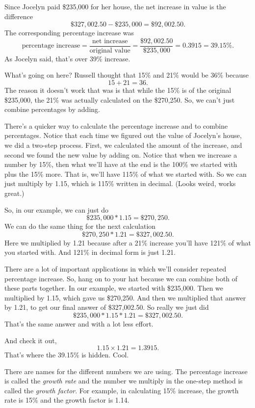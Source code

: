 Since Jocelyn paid \$235,000 for her house, the net increase in value is the difference $$\$327,002.50 - \$235,000 = \$92,002.50.$$ The corresponding percentage increase was $$\text{percentage increase} = \frac{\text{net increase}}{\text{original value}} =\frac{\$92,002.50}{\$235,000}= 0.3915 = 39.15\%.$$  As Jocelyn said, that's over 39\% increase.

What's going on here? Russell thought that 15\% and 21\% would be 36\% because $$15 + 21 = 36.$$ The reason it doesn't work that was is that while the 15\% is of the original \$235,000, the 21\% was actually calculated on the \$270,250.  So, we can't just combine percentages by adding.

There's a quicker way to calculate the percentage increase and to combine percentages.  Notice that each time we figured out the value of Jocelyn's house, we did a two-step process.  First, we calculated the amount of the increase, and second we found the new value by adding on.  Notice that when we increase a number by 15\%, then what we'll have at the end is the 100\% we started with plus the 15\% more.  That is, we'll have 115\% of what we started with.  So we can just multiply by 1.15, which is 115\% written in decimal.  (Looks weird, works great.)  

So, in our example, we can just do $$\$235,000 \ast 1.15 = \$270,250.$$  We can do the same thing for the next calculation $$\$270,250 \ast 1.21 = \$327,002.50.$$  Here we multiplied by 1.21 because after a 21\% increase you'll have 121\% of what you started with.  And 121\% in decimal form is just 1.21.

There are a lot of important applications in which we'll consider repeated percentage increase.  So, hang on to your hat because we can combine both of these parts together.  In our example, we started with \$235,000.  Then we multiplied by 1.15, which gave us \$270,250.  And then we multiplied that answer by 1.21, to get our final answer of \$327,002.50.  So really we just did $$\$235,000 \ast 1.15 \ast 1.21 = \$327,002.50.$$  That's the same answer and with a lot less effort.

And check it out, $$1.15 \times 1.21 = 1.3915.$$ That's where the 39.15\% is hidden. Cool.

There are names for the different numbers we are using.  The percentage increase is called the \emph{growth rate} and the number we multiply in the one-step method is called the \emph{growth factor}.  For example, in calculating 15\% increase, the growth rate is 15\% and the growth factor is 1.14.

